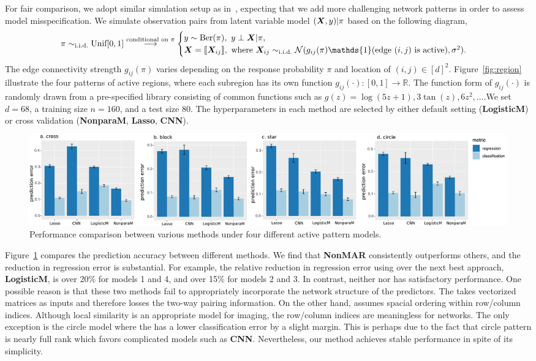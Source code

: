 \documentclass[11pt]{article}
\theoremstyle{definition}
\def\CNN{\text{\bf \small CNN }}
\def\Lasso{\text{\bf \small Lasso }}
\def\NonparaM{\text{\bf \small NonMAR }}
\begin{document}
For fair comparison, we adopt similar simulation setup as in~\cite{relion2019network}, expecting that we add more challenging network patterns in order to assess model misspecification. We simulate observation pairs from latent variable model $(\bm X,y)|\pi$ based on the following diagram,
\[
\pi \sim_{\text{i.i.d.}} \text{Unif}[0,1] \stackrel{\text{conditional on $\pi$}}{\longrightarrow}
\begin{cases}
y\sim \text{Ber}(\pi),\ \text{}y\perp \mX|\pi, \\
\mX=\entry{\mX_{ij}}, \ \text{where\ } \mX_{ij}\sim_{\text{i.i.d.}} \tN(g_{ij}(\pi)\mathds{1}(\text{edge $(i,j)$ is active}), \sigma^2).
\end{cases}
\]
The edge connectivity strength $g_{ij}(\pi)$ varies depending on the response probability $\pi$ and location of $(i,j)\in[d]^2$. Figure~\ref{fig:region} illustrate the four patterns of active regions, where each subregion has its own function $g_{ij}(\cdot)\colon [0,1]\to \mathbb{R}$. The function form of $g_{ij}(\cdot)$ is randomly drawn from a pre-specified library consisting of common functions such as $g(z)=\log(5z+1), 3\tan(z),6z^2,\ldots$.We set $d=68$, a training size $n=160$, and a test size $80$. The hyperparameters in each method are selected by either default setting ({\bf \small LogisticM}) or cross validation ({\bf \small NonparaM}, {\bf \small Lasso}, {\small \bf CNN}). 


\begin{figure}[ht]
    \centering
    \includegraphics[width=\textwidth]{error_tot_comb2.pdf}
    \caption{Performance comparison between various methods under four different active pattern models. }\label{fig:compare}
\end{figure}

Figure~\ref{fig:compare} compares the prediction accuracy between different methods. We find that {\bf \small NonMAR} consistently outperforms others, and the reduction in regression error is substantial. For example, the relative reduction in regression error using \NonparaM over the next best approach, {\bf \small LogisticM}, is over 20\% for models 1 and 4, and over 15\% for models 2 and 3. In contrast, neither \Lasso nor \CNN has satisfactory performance. One possible reason is that these two methods fail to appropriately incorporate the network structure of the predictors. The \Lasso takes vectorized matrices as inputs and therefore losses the two-way pairing information. On the other hand, \CNN assumes spacial ordering within row/column indices. Although local similarity is an appropriate model for imaging, the row/column indices are meaningless for networks. The only exception is the circle model where the \CNN has a lower classification error by a slight margin. This is perhaps due to the fact that circle pattern is nearly full rank which favors complicated models such as {\bf \small CNN}. Nevertheless, our method \NonparaM achieves stable performance in spite of its simplicity. 
\end{document}
